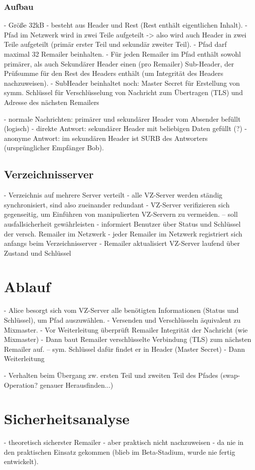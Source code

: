 \subsubsection{Aufbau}
- Größe 32kB
- besteht aus Header und Rest (Rest enthält eigentlichen Inhalt).
- Pfad im Netzwerk wird in zwei Teile aufgeteilt -> also wird auch Header in zwei Teile aufgeteilt (primär erster Teil und sekundär zweiter Teil).
- Pfad darf maximal 32 Remailer beinhalten.
- Für jeden Remailer im Pfad enthält sowohl primärer, als auch Sekundärer Header einen (pro Remailer) Sub-Header, der Prüfsumme für den Rest des Headers enthält (um Integrität des Headers nachzuweisen).
- SubHeader beinhaltet noch: Master Secret für Erstellung von symm. Schlüssel für Verschlüsselung von Nachricht zum Übertragen (TLS) und Adresse des nächsten Remailers

- normale Nachrichten: primärer und sekundärer Header vom Absender befüllt (logisch)
- direkte Antwort: sekundärer Header mit beliebigen Daten gefüllt (?)
- anonyme Antwort: im sekundären Header ist SURB des Antworters (ursprünglicher Empfänger Bob).

\subsection{Verzeichnisserver}
- Verzeichnis auf mehrere Server verteilt
- alle VZ-Server werden ständig synchronisiert, sind also zueinander redundant
- VZ-Server verifizieren sich gegenseitig, um Einführen von manipulierten VZ-Servern zu vermeiden.
-- soll ausfallsicherheit gewährleisten
- informiert Benutzer über Status und Schlüssel der versch. Remailer im Netzwerk
- jeder Remailer im Netzwerk registriert sich anfangs beim Verzeichnisserver
- Remailer aktualisiert VZ-Server laufend über Zustand und Schlüssel

\section{Ablauf}
- Alice besorgt sich vom VZ-Server alle benötigten Informationen (Status und Schlüssel), um Pfad auszuwählen.
- Versenden und Verschlüsseln äquivalent zu Mixmaster.
- Vor Weiterleitung überprüft Remailer Integrität der Nachricht (wie Mixmaster)
- Dann baut Remailer verschlüsselte Verbindung (TLS) zum nächsten Remailer auf.
-- sym. Schlüssel dafür findet er in Header (Master Secret)
- Dann Weiterleitung

- Verhalten beim Übergang zw. ersten Teil und zweiten Teil des Pfades (swap-Operation? genauer Herausfinden...)


\section{Sicherheitsanalyse}
- theoretisch sicherster Remailer
- aber praktisch nicht nachzuweisen
- da nie in den praktischen Einsatz gekommen (blieb im Beta-Stadium, wurde nie fertig entwickelt).


